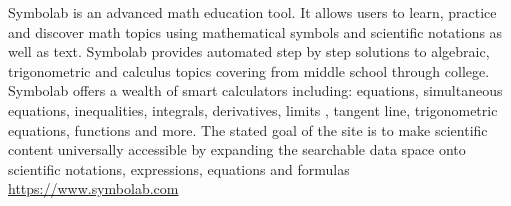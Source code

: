 	{\Large {}}{\Large {}}{\Large {}} Symbolab is an advanced math education tool. It allows users to learn, practice and discover math topics using mathematical symbols and scientific notations as well as text. Symbolab provides automated step by step solutions to algebraic, trigonometric and calculus topics covering from middle school through college. Symbolab offers a wealth of smart calculators including: equations, simultaneous equations, inequalities, integrals, derivatives, limits , tangent line, trigonometric equations, functions and more. The stated goal of the site is to make scientific content universally accessible by expanding the searchable data space onto scientific notations, expressions, equations and formulas \\
	\href{https://www.symbolab.com}{\color{blue}https://www.symbolab.com}
	
